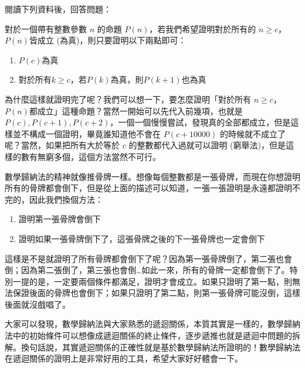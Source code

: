\documentclass[a4paper, 12pt, addpoints]{exam}
\begin{document}
\begin{questions}
    \question[8] 閱讀下列資料後，回答問題：

    對於一個帶有整數參數 $n$ 的命題 $P(n)$，若我們希望證明對於所有的 $n \geq c$，$P(n)$皆成立 (為真)，則只要證明以下兩點即可：
    \begin{enumerate}
        \item $P(c)$為真
        \item 對於所有$k \geq c$，若$P(k)$為真，則$P(k+1)$也為真
    \end{enumerate}

    為什麼這樣就證明完了呢？我們可以想一下，要怎麼證明「對於所有 $n \geq c$，$P(n)$都成立」這種命題？當然一開始可以先代入前幾項，也就是 $P(c), P(c + 1), P(c + 2)$，一個一個慢慢嘗試，發現真的全部都成立，但是這樣並不構成一個證明，畢竟誰知道他不會在 $P(c + 10000)$ 的時候就不成立了呢？當然，如果把所有大於等於 $c$ 的整數都代入過就可以證明 (窮舉法)，但是這樣的數有無窮多個，這個方法當然不可行。

    數學歸納法的精神就像推骨牌一樣。想像每個整數都是一張骨牌，而現在你想證明所有的骨牌都會倒下，但是從上面的描述可以知道，一張一張證明是永遠都證明不完的，因此我們換個方法：
    \begin{enumerate}
        \item 證明第一張骨牌會倒下
        \item 證明如果一張骨牌倒下了，這張骨牌之後的下一張骨牌也一定會倒下
    \end{enumerate}
   
    這樣是不是就證明了所有骨牌都會倒下了呢？因為第一張骨牌倒了，第二張也會倒；因為第二張倒了，第三張也會倒…如此一來，所有的骨牌一定都會倒下了。特別一提的是，一定要兩個條件都滿足，證明才會成立。如果只證明了第一點，則無法保證後面的骨牌也會倒下；如果只證明了第二點，則第一張骨牌可能沒倒，這樣後面就沒戲唱了。

    大家可以發現，數學歸納法與大家熟悉的遞迴關係，本質其實是一樣的，數學歸納法中的初始條件可以想像成遞迴關係的終止條件，逐步遞推也就是遞迴中問題的拆解。換句話說，其實遞迴關係的正確性就是基於數學歸納法所證明的！數學歸納法在遞迴關係的證明上是非常好用的工具，希望大家好好體會一下。
\end{questions}
\end{document}

